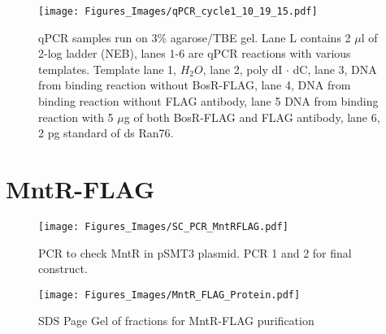 \documentclass[12pt,twoside]{reedthesis}
\begin{document}
 
 
      		 \begin{figure}[h!tbp]
      		\centering
      		\texttt{[image: Figures\_Images/qPCR\_cycle1\_10\_19\_15.pdf]}
      		\caption[qPCR of 1st Cycle of CASTing Gel Analysis]{qPCR samples run on 3\% agarose/TBE gel. Lane L contains 2 $\mu$l of 2-log ladder (NEB), lanes 1-6 are qPCR reactions with various templates. Template lane 1, $H_{2}O$, lane 2, poly dI $\cdot$ dC, lane 3, DNA from binding reaction without BosR-FLAG, lane 4, DNA from binding reaction without FLAG antibody, lane 5 DNA from binding reaction with 5 $\mu$g of both BosR-FLAG and FLAG antibody, lane 6, 2 pg standard of ds Ran76.}
      		\label{qPCRcycle1}
      	\end{figure}
 
 \clearpage
      	
      	
      	
  
  \section*{MntR-FLAG}
        	\begin{figure}[h!tbp]
        		\centering
        		\texttt{[image: Figures\_Images/SC\_PCR\_MntRFLAG.pdf]}
        		\caption[PCR to Create MntR-FLAG]{PCR to check MntR in pSMT3 plasmid. PCR 1 and 2 for final construct.}
        		\label{PCRMntRFLAG}
        	\end{figure}
     
        	\begin{figure}[h!tbp]
        		\centering
        		\texttt{[image: Figures\_Images/MntR\_FLAG\_Protein.pdf]}
        		\caption[MntR-FLAG Purification]{SDS Page Gel of fractions for MntR-FLAG purification}
        		\label{PurificationMntRFLAG}
        	\end{figure}
     
\end{document}
